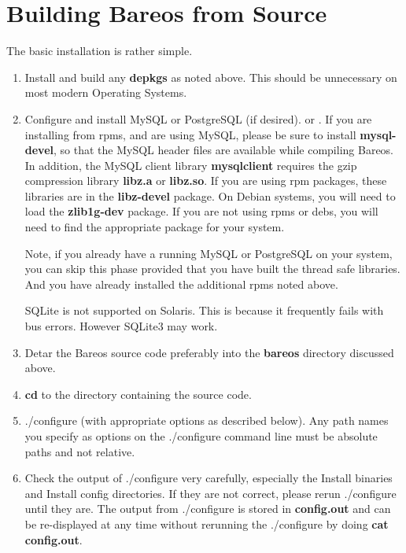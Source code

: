 \section{Building Bareos from Source}
\label{Building}

The basic installation is rather simple.

\begin{enumerate}
\item Install and build any {\bf depkgs} as noted above. This
   should be unnecessary on most modern Operating Systems.

\item Configure and install MySQL or PostgreSQL (if desired).
    or
   .  If you are installing from rpms, and are
   using MySQL, please be sure to install  {\bf mysql-devel}, so that the MySQL
   header files are available  while compiling Bareos. In addition, the MySQL
   client  library {\bf mysqlclient} requires the gzip compression library  {\bf
   libz.a} or {\bf libz.so}. If you are using rpm packages,  these libraries are
   in the {\bf libz-devel} package. On Debian  systems, you will need to load the
   {\bf zlib1g-dev} package. If  you are not using rpms or debs, you will need to
   find the  appropriate package for your system.

   Note, if you already have a running MySQL or PostgreSQL on your system, you
   can skip this phase provided that you have built the thread  safe libraries.
   And you have already installed the additional  rpms noted above.

   SQLite is not supported on Solaris. This is because it
   frequently fails with bus errors.  However SQLite3 may work.

\item Detar the Bareos source code preferably into the {\bf bareos}  directory
   discussed above.

\item {\bf cd} to the directory containing the source code.

\item ./configure (with appropriate options as described below). Any
   path names you specify as options on the ./configure command line
   must be absolute paths and not relative.

\item Check the output of ./configure very carefully, especially  the Install
   binaries and Install config directories.  If they are not correct,
   please rerun ./configure until they  are. The output from ./configure is
   stored in {\bf config.out}  and can be re-displayed at any time without
   rerunning the  ./configure by doing {\bf cat config.out}.


\end{enumerate}
